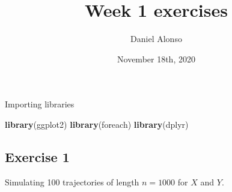 \documentclass[]{article}
\title{Week 1 exercises}
\author{Daniel Alonso}
\date{November 18th, 2020}
\newenvironment{Shaded}{\begin{snugshade}}{\end{snugshade}}
\newcommand{\KeywordTok}[1]{\textcolor[rgb]{0.13,0.29,0.53}{\textbf{#1}}}
\newcommand{\NormalTok}[1]{#1}
\begin{document}
\maketitle

Importing libraries

\begin{Shaded}
\begin{Highlighting}[]
\KeywordTok{library}\NormalTok{(ggplot2)}
\KeywordTok{library}\NormalTok{(foreach)}
\KeywordTok{library}\NormalTok{(dplyr)}
\end{Highlighting}
\end{Shaded}

\hypertarget{exercise-1}{%
\subsection{Exercise 1}\label{exercise-1}}

Simulating 100 trajectories of length \(n = 1000\) for \(X\) and \(Y\).
\end{document}
